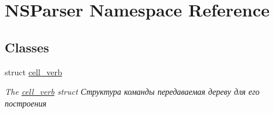 \hypertarget{namespaceNSParser}{}\section{N\+S\+Parser Namespace Reference}
\label{namespaceNSParser}
\subsection*{Classes}
\begin{DoxyCompactItemize}
\item 
struct \hyperlink{structNSParser_1_1cell__verb}{cell\+\_\+verb}
\begin{DoxyCompactList}\small\item\em The \hyperlink{structNSParser_1_1cell__verb}{cell\+\_\+verb} struct Структура команды передаваемая дереву для его построения \end{DoxyCompactList}\end{DoxyCompactItemize}
